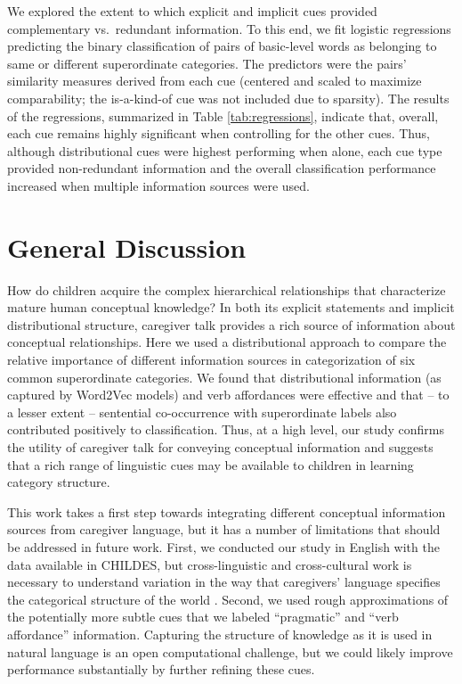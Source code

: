 \documentclass[10pt, letterpaper]{article}
\begin{document}
We explored the extent to which explicit and implicit cues provided
complementary vs.~redundant information. To this end, we fit logistic
regressions predicting the binary classification of pairs of basic-level
words as belonging to same or different superordinate categories. The
predictors were the pairs' similarity measures derived from each cue (centered and scaled to maximize comparability; the is-a-kind-of cue was not included due to sparsity). The results of the regressions,
summarized in Table \ref{tab:regressions}, indicate that, overall, each cue remains highly significant when controlling for the other cues. Thus, although distributional cues were highest performing when alone, each cue type provided non-redundant information and the overall classification performance increased when multiple information sources were used.

\hypertarget{general-discussion}{%
\section{General Discussion}\label{general-discussion}}

How do children acquire the complex hierarchical relationships that characterize mature human conceptual knowledge? In both its explicit statements and implicit distributional structure, caregiver talk provides a rich source of information about conceptual relationships. Here we used a distributional approach to compare the relative importance of different information sources in categorization of six common superordinate categories. We found that distributional information (as captured by Word2Vec models) and verb affordances were effective and that -- to a lesser extent -- sentential co-occurrence with superordinate labels also contributed positively to classification. Thus, at a high level, our study confirms the utility of caregiver talk for conveying conceptual information and suggests that a rich range of linguistic cues may be available to children in learning category structure.

This work takes a first step towards integrating different conceptual information sources from caregiver language, but it has a number of limitations that should be addressed in future work. First, we conducted our study in English with the data available in CHILDES, but cross-linguistic and cross-cultural work is necessary to understand variation in the way that caregivers' language specifies the categorical structure of the world \cite{medin2010}. Second, we used rough approximations of the potentially more subtle cues that we labeled ``pragmatic'' and ``verb affordance'' information. Capturing the structure of knowledge as it is used in natural language is an open computational challenge, but we could likely improve performance substantially by further refining these cues.
\end{document}
